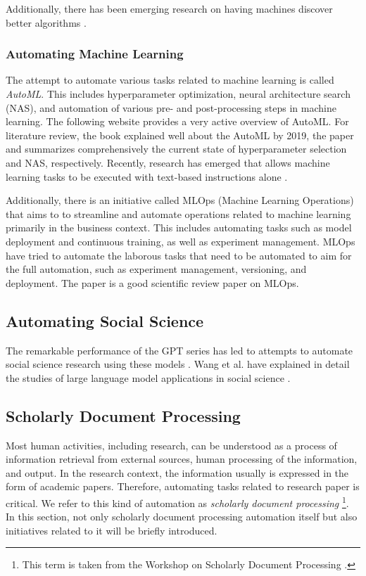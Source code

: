 Additionally, there has been emerging research on having machines discover better algorithms \cite{mankowitz2023faster,fawzi2022discovering}.

\subsubsection{Automating Machine Learning}
The attempt to automate various tasks related to machine learning is called \textit{AutoML}. This includes hyperparameter optimization, neural architecture search (NAS), and automation of various pre- and post-processing steps in machine learning. The following website \cite{automlorg} provides a very active overview of AutoML. For literature review, the book \cite{hutter2019automated} explained well about the AutoML by 2019, the paper \cite{bischl2023hyperparameter} and \cite{lindauer2020best,white2023neural} summarizes comprehensively the current state of hyperparameter selection and NAS, respectively. Recently, research has emerged that allows machine learning tasks to be executed with text-based instructions alone \cite{vijay2023prompt}.

Additionally, there is an initiative called MLOps (Machine Learning Operations) that aims to to streamline and automate operations related to machine learning primarily in the business context. This includes automating tasks such as model deployment and continuous training, as well as experiment management. MLOps have tried to automate the laborous tasks that need to be automated to aim for the full automation, such as experiment management, versioning, and deployment. The paper \cite{kreuzberger2023machine} is a good scientific review paper on MLOps.

\cite{zheng2023can}

\subsection{Automating Social Science}

The remarkable performance of the GPT series has led to attempts to automate social science research using these models \cite{bail2023can,ziems2023can,park2023generative}. Wang et al. have explained in detail the studies of large language model applications in social science \cite{wang2023survey}.

\subsection{Scholarly Document Processing}
Most human activities, including research, can be understood as a process of information retrieval from external sources, human processing of the information, and output. In the research context, the information usually is expressed in the form of academic papers. Therefore, automating 
tasks related to research paper is critical. We refer to this kind of automation as \textit{scholarly document processing} \footnote{
This term is taken from the Workshop on Scholarly Document Processing \cite{wssdp}.
}. In this section, not only scholarly document processing automation itself but also initiatives related to it will be briefly introduced.

